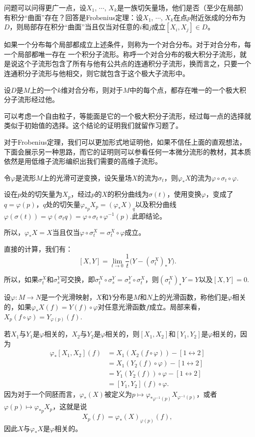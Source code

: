 \para 问题可以问得更广一点，设$X_1$, $\cdots$, $X_k$是一族切矢量场，他们是否（至少在局部）有积分“曲面”存在？回答是Frobenius定理：设$X_1$, $\cdots$, $X_k$在点$p$附近张成的分布为$D$，则局部存在积分“曲面”当且仅当对任意的$i$和$j$成立$[X_i,X_j]\in D$。

如果一个分布每个局部都成立上述条件，则称为一个对合分布。对于对合分布，每一个局部都唯一存在
一个积分子流形。称呼一个对合分布的极大积分子流形，就是说这个子流形包含了所有与他有公共点的连通积分子流形，换而言之，只要一个连通积分子流形与他相交，则它就包含于这个极大子流形中。

\pro 设$D$是$M$上的一个$k$维对合分布，则对于$M$中的每个点，都存在唯一的一个极大积分子流形经过他。

可以考虑一个自由粒子，等能面是它的一个极大积分子流形，经过每一点的选择就类似于初始值的选择。这个结论的证明我们就留作习题了。

\para 对于Frobenius定理，我们可以更加形式地证明他，如果不信任上面的直观想法，下面会展示另一种思路，而它的证明则可以参看任何一本微分流形的教材，其本质依然是用低维子流形编织出我们需要的高维子流形。

\para 令$\varphi$是流形$M$上的光滑可逆变换，设矢量场$X$的流为$\sigma_t$，则$\varphi_*X$的流为$\varphi\circ \sigma_t\circ\varphi$.

设在$p$处的切矢量为$X_p$，经过$p$的$X$的积分曲线为$\sigma(t)$，使用变换$\varphi$，变成了$q=\varphi(p)$，$q$处的切矢量$\varphi_{*p}X_p=(\varphi_*X)_q$以及积分曲线$\varphi(\sigma(t))=\varphi(\sigma_t q)=\varphi\circ\sigma_t\circ \varphi^{-1}(p)$.此即结论。

所以，$\varphi_*X=X$当且仅当$\varphi\circ \sigma^X_t=\sigma^X_t\circ \varphi$成立。

\para 直接的计算，我们有：
	\[
		[X,Y]=\lim_{t\to 0}\frac{1}{t}\bigl(Y-(\sigma_t^X)_*Y\bigr).
	\]

所以，如果$\sigma_t^X$和$\sigma_s^Y$可交换，即$\sigma_t^X\circ \sigma_s^Y=\sigma_s^Y\circ \sigma_t^X$，则$(\sigma_t^X)_*Y=Y$以及$[X,Y]=0$.

\para 设$\varphi:M\to N$是一个光滑映射，$X$和$Y$分布是$M$和$N$上的光滑函数，称他们是$\varphi$相关的，如果$\varphi_*X(f)=Y(f)\circ \varphi$对任意光滑函数$f$成立。局部来看，$X_p(f\circ \varphi)=Y_{\varphi(p)}(f)$.

若$X_1$与$Y_1$是$\varphi$相关的，$X_2$与$Y_2$是$\varphi$相关的，则$[X_1,X_2]$和$[Y_1,Y_2]$是$\varphi$相关的，因为
\begin{align*}
	\varphi_*[X_1,X_2](f)&=X_1(X_2(f\circ \varphi))-[1\leftrightarrow 2]\\
	&=X_1(Y_2(f)\circ\varphi)-[1\leftrightarrow 2]\\
	&=Y_1(Y_2(f))\circ \varphi-[1\leftrightarrow 2]\\
	&=[Y_1,Y_2](f)\circ \varphi.
\end{align*}
因为对于一个同胚而言，$\varphi_*(X)$被定义为$p\mapsto \varphi_{*\varphi^{-1}(p)}X_{\varphi^{-1}(p)}$，或者$\varphi(p)\mapsto \varphi_{*p}X_p$，这就是说
\[
	X_p(f)=\varphi_*(X)_{\varphi(p)}(f),
\]
因此$X$与$\varphi_*X$是$\varphi$相关的。



